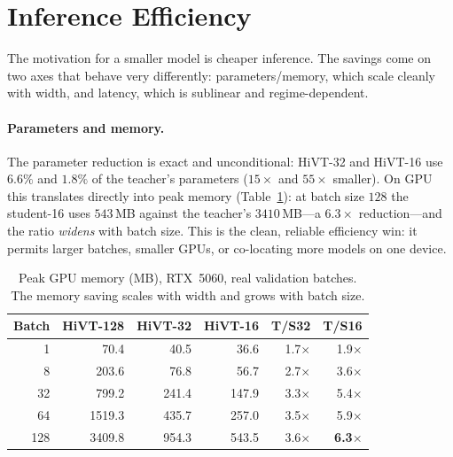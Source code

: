 \section{Inference Efficiency}
\label{sec:res_eff}

The motivation for a smaller model is cheaper inference. The savings come on two
axes that behave very differently: parameters/memory, which scale cleanly with
width, and latency, which is sublinear and regime-dependent.

\paragraph{Parameters and memory.}
The parameter reduction is exact and unconditional: HiVT-32 and HiVT-16 use $6.6\%$
and $1.8\%$ of the teacher's parameters ($15\times$ and $55\times$ smaller). On GPU
this translates directly into peak memory (Table~\ref{tab:gpumem}): at batch size
$128$ the student-16 uses $543$\,MB against the teacher's $3410$\,MB---a $6.3\times$
reduction---and the ratio \emph{widens} with batch size. This is the clean,
reliable efficiency win: it permits larger batches, smaller GPUs, or co-locating
more models on one device.

\begin{table}[htbp]
  \centering
  \caption{Peak GPU memory (MB), RTX~5060, real validation batches. The memory
    saving scales with width and grows with batch size.}
  \label{tab:gpumem}
  \begin{tabular}{rrrrrr}
    \toprule
    Batch & HiVT-128 & HiVT-32 & HiVT-16 & T/S32 & T/S16 \\
    \midrule
    1   & 70.4   & 40.5  & 36.6  & 1.7$\times$ & 1.9$\times$ \\
    8   & 203.6  & 76.8  & 56.7  & 2.7$\times$ & 3.6$\times$ \\
    32  & 799.2  & 241.4 & 147.9 & 3.3$\times$ & 5.4$\times$ \\
    64  & 1519.3 & 435.7 & 257.0 & 3.5$\times$ & 5.9$\times$ \\
    128 & 3409.8 & 954.3 & 543.5 & 3.6$\times$ & \textbf{6.3$\times$} \\
    \bottomrule
  \end{tabular}
\end{table}

